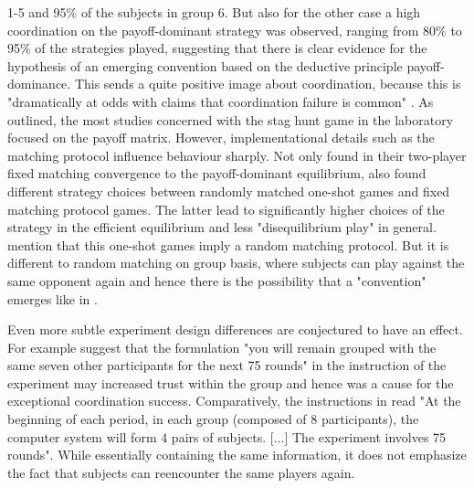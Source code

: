 \documentclass[12pt]{article}
\begin{document}
1-5 and 95\% of the subjects in group 6. But also for the other case a high
coordination on the payoff-dominant strategy was observed, ranging from 
80\% to 95\% of the strategies played, suggesting that there is clear evidence
for the hypothesis of an emerging convention based on the deductive principle
payoff-dominance. This sends a quite positive image about coordination, because 
this is "dramatically at odds with claims that coordination failure is common"
\parencite[9]{devetag_when_2007}. 
As outlined, the most studies concerned with the stag hunt game in the 
laboratory focused on the payoff matrix. However, implementational details 
such as the matching protocol influence behaviour sharply. Not only 
\textcite{van_huyck_tacit_1990} found in their two-player fixed matching
convergence to the payoff-dominant equilibrium, 
\textcite{clark_repetition_2001} also found different strategy 
choices between randomly matched one-shot games and fixed matching protocol 
games. The latter lead to significantly higher choices of the strategy 
in the efficient equilibrium and less "disequilibrium play" in general. 
\textcite{devetag_when_2007} mention that this one-shot games imply a 
random matching protocol. But it is different to random matching on group
basis, where subjects can play against the same opponent again 
and hence there is the possibility that a "convention" emerges like in 
\cite{rankin_strategic_2000}.

Even more subtle experiment design differences are conjectured to have an
effect. For example \textcite{devetag_when_2007} suggest that the formulation
"you will remain grouped with the same seven other participants for the next
75 rounds" in the instruction of the \textcite{rankin_strategic_2000} 
experiment may increased trust within the group and hence was a 
cause for the exceptional coordination success. Comparatively, the 
instructions in \textcite{dubois_optimization_2012} read "At the beginning
of each period, in each group (composed of 8 participants), the computer
system will form 4 pairs of subjects. [...] The experiment 
involves 75 rounds". While essentially containing the same information,
it does not emphasize the fact that subjects can reencounter the same 
players again. 
\end{document}
